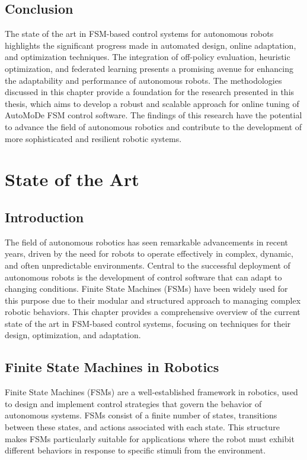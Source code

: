 \documentclass{ULBreport}
\begin{document}
\section{Conclusion}
The state of the art in FSM-based control systems for autonomous robots highlights the significant progress made in automated design, online adaptation, and optimization techniques. The integration of off-policy evaluation, heuristic optimization, and federated learning presents a promising avenue for enhancing the adaptability and performance of autonomous robots. The methodologies discussed in this chapter provide a foundation for the research presented in this thesis, which aims to develop a robust and scalable approach for online tuning of AutoMoDe FSM control software. The findings of this research have the potential to advance the field of autonomous robotics and contribute to the development of more sophisticated and resilient robotic systems.

\printbibliography


\chapter{State of the Art}

\section{Introduction}
The field of autonomous robotics has seen remarkable advancements in recent years, driven by the need for robots to operate effectively in complex, dynamic, and often unpredictable environments. Central to the successful deployment of autonomous robots is the development of control software that can adapt to changing conditions. Finite State Machines (FSMs) have been widely used for this purpose due to their modular and structured approach to managing complex robotic behaviors. This chapter provides a comprehensive overview of the current state of the art in FSM-based control systems, focusing on techniques for their design, optimization, and adaptation.

\section{Finite State Machines in Robotics}
Finite State Machines (FSMs) are a well-established framework in robotics, used to design and implement control strategies that govern the behavior of autonomous systems. FSMs consist of a finite number of states, transitions between these states, and actions associated with each state. This structure makes FSMs particularly suitable for applications where the robot must exhibit different behaviors in response to specific stimuli from the environment.
\end{document}
